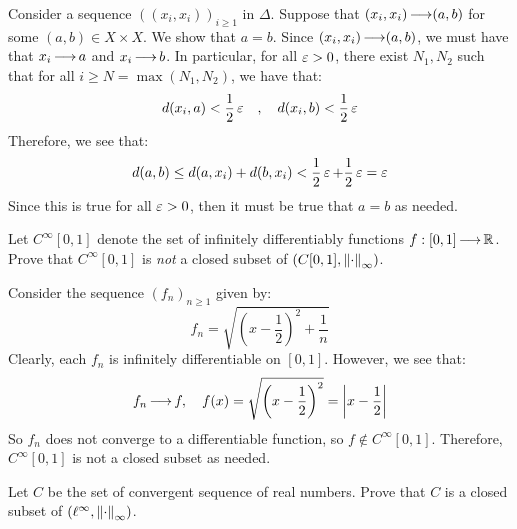 \begin{soln}
    Consider a sequence $ ((x_{i}, x_{i}))_{i \geq 1} $ in $ \Delta $.
    Suppose that $ (x_{i}, x_{i}) \operatorname{\longrightarrow} (a, b) $ for some $ (a, b) \in X
    \times X $. We show that $ a = b $. \vsp
    Since $ (x_{i}, x_{i}) \operatorname{\longrightarrow} (a, b) $, we must have that $ x_{i}
    \operatorname{\longrightarrow} a $ and $ x_{i} \operatorname{\longrightarrow} b $. In particular, for all
    $ \operatorname{\varepsilon} > 0 $, there exist $ N_{1}, N_{2} $ such that for all $ i \geq N
    = \max(N_{1}, N_{2}) $, we have that:
    \begin{equation*}
        d(x_{i}, a) < \frac{1}{2}\operatorname{\varepsilon} \quad , \quad d(x_{i}, b) < \frac{1}{2}\operatorname{\varepsilon}
    \end{equation*}
    Therefore, we see that:
    \begin{equation*}
        d(a, b) \leq d(a, x_{i}) + d(b, x_{i}) < \frac{1}{2}\operatorname{\varepsilon} + \frac{1}{2}\operatorname{\varepsilon}
        = \operatorname{\varepsilon}
    \end{equation*}
    Since this is true for all $ \operatorname{\varepsilon} > 0 $, then it must be true that $ a = b $
    as needed.
\end{soln}


\newpage
\label{q9}
\begin{qu}[num=9.1]
   Let $C^\infty[0,1]$ denote the set of infinitely differentiably functions
   $f:[0,1]\operatorname{\longrightarrow} \mathbb{R}$. Prove that $C^\infty[0,1]$ is \textit{not} a
   closed subset of $(C[0,1],\left\|\cdot\right\|_{\infty})$.
\end{qu}

\begin{soln}
    Consider the sequence $ (f_{n})_{n \geq 1} $ given by:
    \begin{equation*}
        f_{n} = \sqrt{ \left( x - \frac{1}{2} \right)^{2} + \frac{1}{n}}
    \end{equation*}
    Clearly, each $ f_{n} $ is infinitely differentiable on $ [0, 1] $. However,
    we see that:
    \begin{equation*}
        f_{n} \operatorname{\longrightarrow} f , \quad f(x) = \sqrt{ \left( x - \frac{1}{2}
        \right)^{2}} = \abs{x - \frac{1}{2}}
    \end{equation*}
    So $ f_{n} $ does not converge to a differentiable function, so $ f \notin
    C^{\infty}[0, 1] $. Therefore, $ C^{\infty}[0, 1] $ is not a closed subset
    as needed.
\end{soln}

\begin{qu}[num=9.2]
    Let $ C $ be the set of convergent sequence of real numbers.
    Prove that $ C $ is a closed subset of $ (\ell^{\infty},
    \left\|\cdot\right\|_{\infty}) $.
\end{qu}

